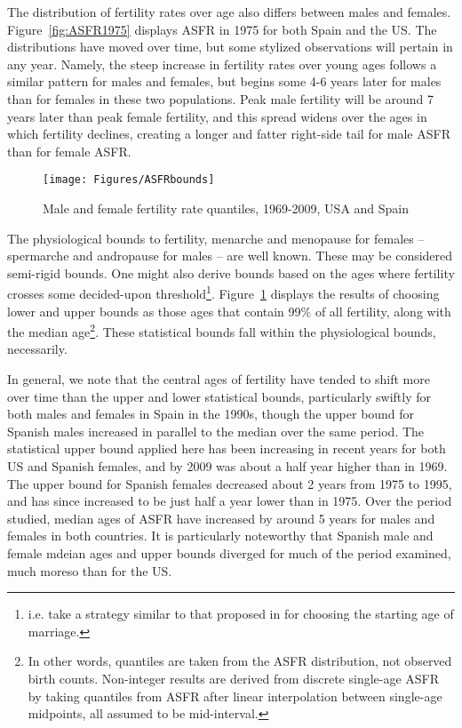 The distribution of fertility rates over age also differs between males and
females. Figure~\ref{fig:ASFR1975} displays ASFR in 1975 for both Spain and the
US. The distributions have moved over time, but some stylized observations will
pertain in any year. Namely, the steep increase in fertility rates over young
ages follows a similar pattern for males and females, but begins some 4-6 years
later for males than for females in these two populations. Peak male fertility
will be around 7 years later than peak female fertility, and this spread widens
over the ages in which fertility declines, creating a longer and fatter
right-side tail for male ASFR than for female ASFR. 

\begin{figure}[ht!]
        \centering  
          \caption{Male and female fertility rate quantiles, 1969-2009, USA and
          Spain}
           \texttt{[image: Figures/ASFRbounds]}
          \label{fig:TFRboundsseries}
\end{figure}

The physiological bounds to fertility, menarche and menopause for
females -- spermarche and andropause for males -- are well known. These may be
considered semi-rigid bounds. One might also derive bounds based on the ages
where fertility crosses some decided-upon threshold\footnote{i.e. take a
strategy similar to that proposed in \citet{coale1971age} for choosing the
starting age of marriage.}. Figure~\ref{fig:TFRboundsseries} displays the
results of choosing lower and upper bounds as those ages that contain 99\% of
all fertility, along with the median age\footnote{In other words, quantiles are
taken from the ASFR distribution, not observed birth counts. Non-integer results are derived from
discrete single-age ASFR by taking quantiles from ASFR after linear
interpolation between single-age midpoints, all assumed to be mid-interval.}. 
These statistical bounds fall within the physiological bounds, necessarily. 

In general, we note that the central ages of fertility have tended to shift more
over time than the upper and lower statistical bounds, particularly swiftly for
both males and females in Spain in the 1990s, though the upper bound for
Spanish males increased in parallel to the median over the same period. The
statistical upper bound applied here has been increasing in recent years for
both US and Spanish females, and by 2009 was about a half year higher than in
1969. The upper bound for Spanish females decreased about 2 years from 1975
to 1995, and has since increased to be just half a year lower than in 1975. Over
the period studied, median ages of ASFR have increased by around 5 years for
males and females in both countries. It is particularly noteworthy that Spanish
male and female mdeian ages and upper bounds diverged for much of the period
examined, much moreso than for the US.

